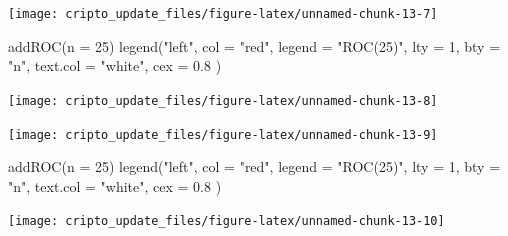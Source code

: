 \documentclass[]{tufte-handout}
\newenvironment{Shaded}{}{}
\newcommand{\AttributeTok}[1]{\textcolor[rgb]{0.49,0.56,0.16}{#1}}
\newcommand{\DecValTok}[1]{\textcolor[rgb]{0.25,0.63,0.44}{#1}}
\newcommand{\FloatTok}[1]{\textcolor[rgb]{0.25,0.63,0.44}{#1}}
\newcommand{\FunctionTok}[1]{\textcolor[rgb]{0.02,0.16,0.49}{#1}}
\newcommand{\NormalTok}[1]{#1}
\newcommand{\OtherTok}[1]{\textcolor[rgb]{0.00,0.44,0.13}{#1}}
\newcommand{\SpecialCharTok}[1]{\textcolor[rgb]{0.25,0.44,0.63}{#1}}
\newcommand{\StringTok}[1]{\textcolor[rgb]{0.25,0.44,0.63}{#1}}
\begin{document}
\texttt{[image: cripto\_update\_files/figure-latex/unnamed-chunk-13-7]}

\begin{Shaded}
\begin{Highlighting}[]
\FunctionTok{addROC}\NormalTok{(}\AttributeTok{n =} \DecValTok{25}\NormalTok{)}
\FunctionTok{legend}\NormalTok{(}\StringTok{"left"}\NormalTok{,}
  \AttributeTok{col =} \StringTok{"red"}\NormalTok{, }\AttributeTok{legend =} \StringTok{"ROC(25)"}\NormalTok{, }\AttributeTok{lty =} \DecValTok{1}\NormalTok{, }\AttributeTok{bty =} \StringTok{"n"}\NormalTok{,}
  \AttributeTok{text.col =} \StringTok{"white"}\NormalTok{, }\AttributeTok{cex =} \FloatTok{0.8}
\NormalTok{)}
\end{Highlighting}
\end{Shaded}

\texttt{[image: cripto\_update\_files/figure-latex/unnamed-chunk-13-8]}

\begin{Shaded}
\end{Shaded}

\texttt{[image: cripto\_update\_files/figure-latex/unnamed-chunk-13-9]}

\begin{Shaded}
\begin{Highlighting}[]
\FunctionTok{addROC}\NormalTok{(}\AttributeTok{n =} \DecValTok{25}\NormalTok{)}
\FunctionTok{legend}\NormalTok{(}\StringTok{"left"}\NormalTok{,}
  \AttributeTok{col =} \StringTok{"red"}\NormalTok{, }\AttributeTok{legend =} \StringTok{"ROC(25)"}\NormalTok{, }\AttributeTok{lty =} \DecValTok{1}\NormalTok{, }\AttributeTok{bty =} \StringTok{"n"}\NormalTok{,}
  \AttributeTok{text.col =} \StringTok{"white"}\NormalTok{, }\AttributeTok{cex =} \FloatTok{0.8}
\NormalTok{)}
\end{Highlighting}
\end{Shaded}

\texttt{[image: cripto\_update\_files/figure-latex/unnamed-chunk-13-10]}
\end{document}

